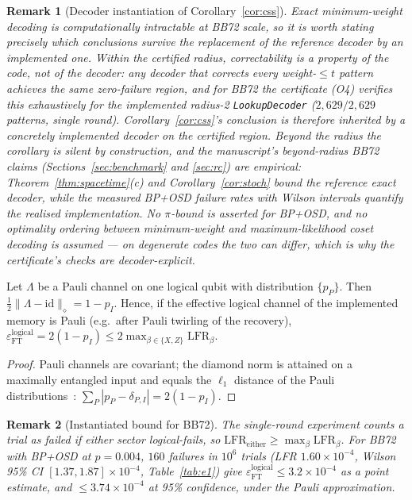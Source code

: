 \documentclass[11pt,a4paper]{article}
\newtheorem{remark}{Remark}
\begin{document}
\begin{remark}[Decoder instantiation of Corollary~\ref{cor:css}]
\label{rem:decoder-inst}
Exact minimum-weight decoding is computationally intractable at BB72
scale, so it is worth stating precisely which conclusions survive the
replacement of the reference decoder by an implemented one.
\emph{Within the certified radius}, correctability is a property of
the code, not of the decoder: any decoder that corrects every
weight-$\le t$ pattern achieves the same zero-failure region, and for
BB72 the certificate (O4) verifies this exhaustively for the
implemented radius-2 \texttt{LookupDecoder} ($2{,}629/2{,}629$
patterns, single round). Corollary~\ref{cor:css}'s conclusion is
therefore inherited by a concretely implemented decoder on the
certified region.
\emph{Beyond the radius} the corollary is silent by construction, and
the manuscript's beyond-radius BB72 claims (Sections~\ref{sec:benchmark}
and \ref{sec:rc}) are empirical: Theorem~\ref{thm:spacetime}(c) and
Corollary~\ref{cor:stoch} bound the reference exact decoder, while the
measured BP+OSD failure rates with Wilson intervals quantify the
realised implementation. No $\pi$-bound is asserted for BP+OSD, and no
optimality ordering between minimum-weight and maximum-likelihood coset
decoding is assumed --- on degenerate codes the two can differ, which is
why the certificate's checks are decoder-explicit.
\end{remark}

\begin{proposition}\label{prop:bridge}
Let $\Lambda$ be a Pauli channel on one logical qubit with distribution
$\{p_P\}$. Then $\tfrac12\|\Lambda-\mathrm{id}\|_\diamond=1-p_I$.
Hence, if the effective logical channel of the implemented memory is
Pauli (e.g.\ after Pauli twirling of the recovery),
$\varepsilon_{\mathrm{FT}}^{\mathrm{logical}}=2(1-p_I)\le
2\max_{\beta\in\{X,Z\}}\mathrm{LFR}_\beta$.
\end{proposition}
\begin{proof}
Pauli channels are covariant; the diamond norm is attained on a
maximally entangled input and equals the $\ell_1$ distance of the Pauli
distributions~\cite{Watrous2018}: $\sum_P|p_P-\delta_{P,I}|=2(1-p_I)$.
\end{proof}
\begin{remark}[Instantiated bound for BB72]\label{rem:bridge-number}
The single-round experiment counts a trial as failed if either sector
logical-fails, so $\mathrm{LFR}_{\mathrm{either}}\ge
\max_{\beta}\mathrm{LFR}_{\beta}$. For BB72 with BP+OSD at $p=0.004$,
$160$ failures in $10^{6}$ trials (LFR $1.60\times10^{-4}$, Wilson 95\%
CI $[1.37,1.87]\times10^{-4}$, Table~\ref{tab:e1}) give
$\varepsilon_{\mathrm{FT}}^{\mathrm{logical}}\le3.2\times10^{-4}$ as a
point estimate, and $\le3.74\times10^{-4}$ at 95\% confidence, under
the Pauli approximation.
\end{remark}
\end{document}
